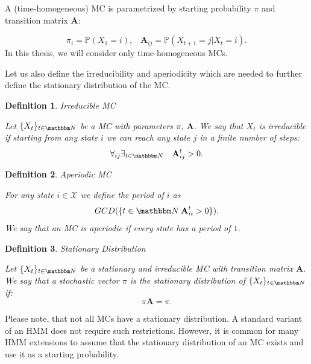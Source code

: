 \documentclass[shortabstract]{iithesis}
\newtheorem{definition}{Definition}
\begin{document}
A (time-homogeneous) MC is parametrized by starting probability $\pi$ and transition matrix $\textbf{A}$:

\begin{subequations}
    \begin{equation*}
        \pi_i = \mathbb P (X_{1} = i)\text{,}
        \quad
       \textbf{A}_{ij} = \mathbb P (X_{t+1} = j | X_t = i)\text{.}
    \end{equation*}
\end{subequations}
\linebreak
In this thesis, we will consider only time-homogeneous MCs. 

Let us also define the irreducibility and aperiodicity which are needed to further define the stationary distribution of the MC. 

\begin{definition}{Irreducible  MC} \label{def:irreducible}

    Let $\{X_t\}_{t \in \mathbbm N}$ be a MC with parameters $\pi$, $\textbf{A}$. We say that $X_t$ is irreducible if starting from any state $i$ we can reach any state $j$ in a  finite number of steps:
    \begin{equation*}
        \forall_{ij}  \exists_{t \in \mathbbm N} \quad \textbf{A}^t_{ij}  > 0 \text{.}
    \end{equation*}
\end{definition}

\begin{definition}{Aperiodic MC} \label{def:aperiodic}

    For any state $i \in \mathcal X$ we define the period of $i$ as $$GCD(\{t \in \mathbbm N\: \textbf{A}^t_{ii} > 0 \}).$$ We say that an MC is aperiodic if every state has a period of $1$.
\end{definition}

\begin{definition}{Stationary Distribution} \label{def:stationary}

Let $\{X_t\}_{t \in \mathbbm N}$ be a stationary and irreducible MC with transition matrix $\textbf{A}$. We say that a stochastic vector $\pi$ is the stationary distribution of $\{X_t\}_{t \in \mathbbm N}$ if:
\begin{equation*}
    \pi \textbf{A} =  \pi\text{.}
\end{equation*}
\end{definition}

Please note, that not all MCs have a stationary distribution. A standard variant of an HMM does not require such restrictions. However, it is common for many HMM extensions to assume that the stationary distribution of an MC exists and use it as a starting probability. 
\end{document}
